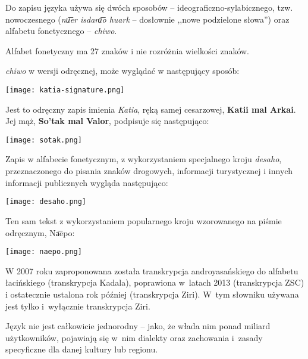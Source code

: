 \begin{spacing}{1.1}
Do zapisu języka używa się dwóch sposobów --  ideograficzno-sylabicznego,
tzw. nowoczesnego (\emph{nu͞er isdara͞o huark} -- dosłownie
,,nowe podzielone słowa'') oraz alfabetu fonetycznego -- \emph{chiwo}.

Alfabet fonetyczny ma 27 znaków i nie rozróżnia wielkości znaków.

\emph{chiwo} w wersji odręcznej, może wyglądać w następujący sposób:

\begin{center}
    \texttt{[image: katia-signature.png]}    
\end{center}

Jest to odręczny zapis imienia \emph{Katia}, ręką samej cesarzowej,
\textbf{Katii mal Arkai}. Jej mąż, \textbf{So'tak mal Valor}, podpisuje się 
następująco:

\begin{center}
    \texttt{[image: sotak.png]}
\end{center}

Zapis w alfabecie fonetycznym, z wykorzystaniem specjalnego kroju \emph{desaho},
przeznaczonego do pisania znaków drogowych, informacji turystycznej i innych
informacji publicznych wygląda następująco:

\begin{center}
    \texttt{[image: desaho.png]}
\end{center}

\skipline

Ten sam tekst z wykorzystaniem popularnego kroju wzorowanego na piśmie odręcznym,
Na͞epo:

\begin{center}
    \texttt{[image: naepo.png]}
\end{center}

W 2007 roku zaproponowana została transkrypcja androyasańskiego do alfabetu 
łacińskiego (transkrypcja Kadala), poprawiona w~latach 2013 (transkrypcja 
ZSC) i ostatecznie ustalona rok później (transkrypcja Ziri). W~tym słowniku
używana jest tylko i~wyłącznie transkrypcja Ziri.

Język nie jest całkowicie jednorodny -- jako, że włada nim ponad miliard 
użytkowników, pojawiają się w~nim dialekty oraz zachowania i~zasady specyficzne 
dla danej kultury lub regionu. 


\end{spacing}
